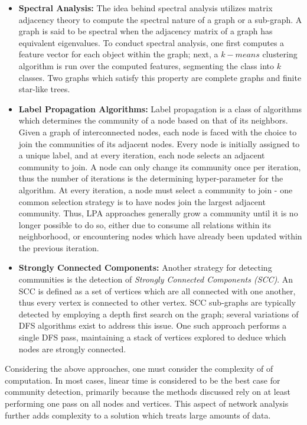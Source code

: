 \documentclass[10pt,journal,final,a4paper]{IEEEtran}
\begin{document}
\begin{itemize}
\item \textbf{Spectral Analysis:} The idea behind spectral analysis utilizes matrix adjacency theory to compute the spectral nature of a graph or a sub-graph. A graph is said to be spectral when the adjacency matrix of a graph has equivalent eigenvalues. To conduct spectral analysis, one first computes a feature vector for each object within the graph; next, a $k-means$ clustering algorithm is run over the computed features, segmenting the class into $k$ classes. Two graphs which satisfy this property are complete graphs and finite star-like trees.
\item \textbf{Label Propagation Algorithms:} Label propagation is a class of algorithms which determines the community of a node based on that of its neighbors. Given a graph of interconnected nodes, each node is faced with the choice to join the communities of its adjacent nodes. Every node is initially assigned to a unique label, and at every iteration, each node selects an adjacent community to join. A node can only change its community once per iteration, thus the number of iterations is the determining hyper-parameter for the algorithm. At every iteration, a node must select a community to join - one common selection strategy is to have nodes join the largest adjacent community. Thus, LPA approaches generally grow a community until it is no longer possible to do so, either due to consume all relations within its neighborhood, or encountering nodes which have already been updated within the previous iteration\cite{grapH_lpa}.
\item \textbf{Strongly Connected Components:} Another strategy for detecting communities is the detection of \textit{Strongly Connected Components (SCC)}. An SCC is defined as a set of vertices which are all connected with one another, thus every vertex is connected to other vertex. SCC sub-graphs are typically detected by employing a depth first search on the graph; several variations of DFS algorithms exist to address this issue. One such approach performs a single DFS pass, maintaining a stack of vertices explored to deduce which nodes are strongly connected.
\end{itemize}

Considering the above approaches, one must consider the complexity of of computation. In most cases, linear time is considered to be the best case for community detection, primarily because the methods discussed rely on at least performing one pass on all nodes and vertices. This aspect of network analysis further adds complexity to a solution which treats large amounts of data.
\end{document}
